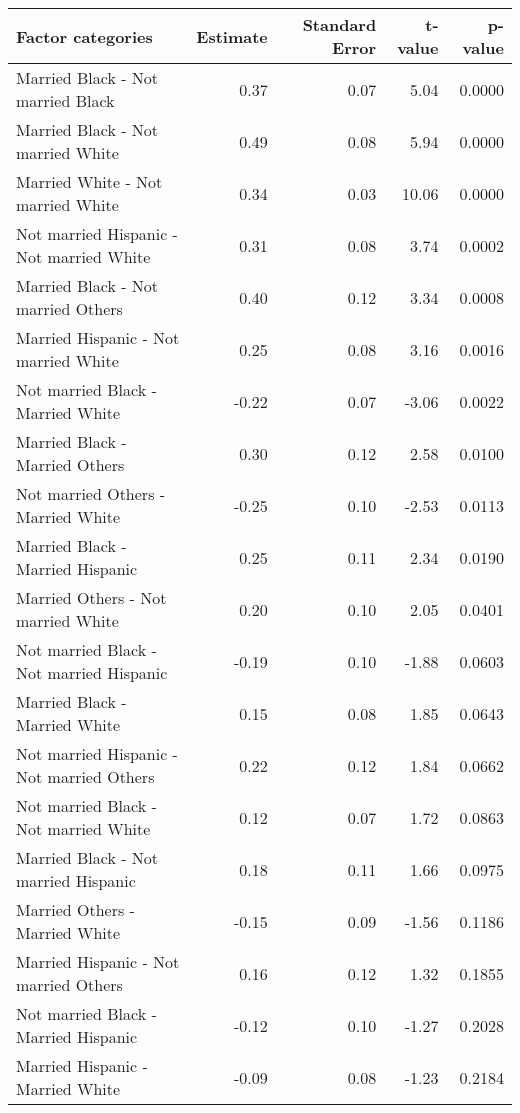 \begin{table}[H]
\footnotesize
\centering
\begin{tabular}{lrrrr}
  \hline
  Factor categories & Estimate & Standard Error & t-value & p-value \\ 
  \hline
    Married Black -  Not married Black & 0.37 & 0.07 & 5.04 & 0.0000 \\ 
    Married Black -  Not married White & 0.49 & 0.08 & 5.94 & 0.0000 \\ 
    Married White -  Not married White & 0.34 & 0.03 & 10.06 & 0.0000 \\ 
    Not married Hispanic -  Not married White & 0.31 & 0.08 & 3.74 & 0.0002 \\ 
    Married Black -  Not married Others & 0.40 & 0.12 & 3.34 & 0.0008 \\ 
    Married Hispanic -  Not married White & 0.25 & 0.08 & 3.16 & 0.0016 \\ 
    Not married Black -  Married White & -0.22 & 0.07 & -3.06 & 0.0022 \\ 
    Married Black -  Married Others & 0.30 & 0.12 & 2.58 & 0.0100 \\ 
    Not married Others -  Married White & -0.25 & 0.10 & -2.53 & 0.0113 \\ 
    Married Black -  Married Hispanic & 0.25 & 0.11 & 2.34 & 0.0190 \\ 
    Married Others -  Not married White & 0.20 & 0.10 & 2.05 & 0.0401 \\ 
    Not married Black -  Not married Hispanic & -0.19 & 0.10 & -1.88 & 0.0603 \\ 
    Married Black -  Married White & 0.15 & 0.08 & 1.85 & 0.0643 \\ 
    Not married Hispanic -  Not married Others & 0.22 & 0.12 & 1.84 & 0.0662 \\ 
    Not married Black -  Not married White & 0.12 & 0.07 & 1.72 & 0.0863 \\ 
    Married Black -  Not married Hispanic & 0.18 & 0.11 & 1.66 & 0.0975 \\ 
    Married Others -  Married White & -0.15 & 0.09 & -1.56 & 0.1186 \\ 
    Married Hispanic -  Not married Others & 0.16 & 0.12 & 1.32 & 0.1855 \\ 
    Not married Black -  Married Hispanic & -0.12 & 0.10 & -1.27 & 0.2028 \\ 
    Married Hispanic -  Married White & -0.09 & 0.08 & -1.23 & 0.2184 \\ 

\end{tabular}
\end{table}
